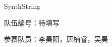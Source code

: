 \documentclass[UTF8,a4paper,zihao=-4,fontset=windows,oneside,openany]{ctexbook}
\newcommand{\worktitle}{SynthString}
\newcommand{\teamnumber}{待填写}
\newcommand{\teammembers}{李昊阳，唐楠睿，吴昊}
\begin{document}
\begin{titlepage}
\thispagestyle{cover}
\centering
\vspace*{42mm}
{\heiti{}\worktitle\par}
\vfill
{队伍编号：\teamnumber\par}
\vspace{10mm}
{参赛队员：\teammembers\par}
\vspace*{38mm}
\end{titlepage}
\frontmatter

\tableofcontents
\mainmatter





\appendix



\end{document}
